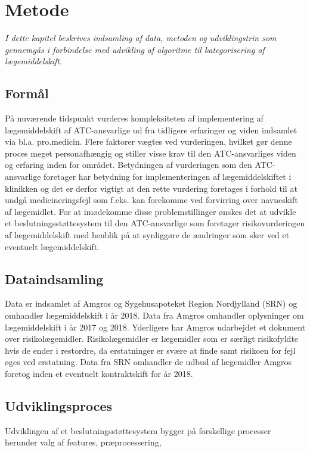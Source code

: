 \chapter{Metode}
\textit{I dette kapitel beskrives indsamling af data, metoden og udviklingstrin som gennemgås i forbindelse med udvikling af algoritme til kategorisering af  lægemiddelskift.}

\section{Formål}
På nuværende tidspunkt vurderes kompleksiteten af implementering af lægemiddelskift af ATC-ansvarlige ud fra tidligere erfaringer og viden indsamlet via bl.a. pro.medicin. Flere faktorer vægtes ved vurderingen, hvilket gør denne proces meget personafhængig og stiller visse krav til den ATC-ansvarliges viden og erfaring inden for området. Betydningen af vurderingen som den ATC-ansvarlige foretager har betydning for implementeringen af lægemiddelskiftet i klinikken og det er derfor vigtigt at den rette vurdering foretages i forhold til at undgå medicineringsfejl som f.eks. kan forekomme ved forvirring over navneskift af lægemidlet.
For at imødekomme disse problemstillinger ønskes det at udvikle et beslutningsstøttesystem til den ATC-ansvarlige som foretager risikovurderingen af lægemiddelskift med henblik på at synliggøre de ændringer som sker ved et eventuelt lægemiddelskift. 

\section{Dataindsamling}
Data er indsamlet af Amgros og Sygehusapoteket Region Nordjylland (SRN) og omhandler lægemiddelskift i år 2018. Data fra Amgros omhandler oplysninger om lægemiddelskift i år 2017 og 2018. Yderligere har Amgros udarbejdet et dokument over risikolægemidler. Risikolægemidler er lægemidler som er særligt risikofyldte hvis de ender i restordre, da erstatninger er svære at finde samt risikoen for fejl øges ved erstatning. Data fra SRN omhandler de udbud af lægemidler Amgros foretog inden et eventuelt kontraktskift for år 2018. 

\section{Udviklingsproces}
Udviklingen af et beslutningsstøttesystem bygger på forskellige processer herunder valg af features, præprocessering, 


